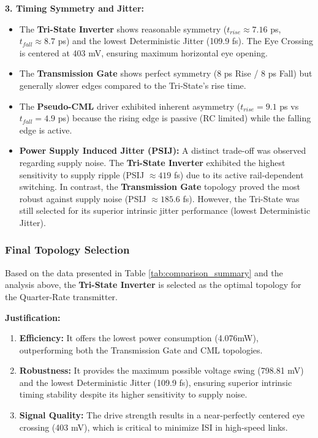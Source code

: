 \documentclass[12pt, a4paper]{report}
\begin{document}
\textbf{3. Timing Symmetry and Jitter:}
\begin{itemize}
    \item The \textbf{Tri-State Inverter} shows reasonable symmetry ($t_{rise} \approx 7.16$ ps, $t_{fall} \approx 8.7$ ps) and the lowest Deterministic Jitter (109.9 fs). The Eye Crossing is centered at 403 mV, ensuring maximum horizontal eye opening.
    \item The \textbf{Transmission Gate} shows perfect symmetry (8 ps Rise / 8 ps Fall) but generally slower edges compared to the Tri-State's rise time.
    \item The \textbf{Pseudo-CML} driver exhibited inherent asymmetry ($t_{rise}=9.1$ ps vs $t_{fall}=4.9$ ps) because the rising edge is passive (RC limited) while the falling edge is active.
    \item \textbf{Power Supply Induced Jitter (PSIJ):} A distinct trade-off was observed regarding supply noise. The \textbf{Tri-State Inverter} exhibited the highest sensitivity to supply ripple (PSIJ $\approx 419$ fs) due to its active rail-dependent switching. In contrast, the \textbf{Transmission Gate} topology proved the most robust against supply noise (PSIJ $\approx 185.6$ fs). However, the Tri-State was still selected for its superior intrinsic jitter performance (lowest Deterministic Jitter).
\end{itemize}
\subsubsection{Final Topology Selection}
Based on the data presented in Table \ref{tab:comparison_summary} and the analysis above, the \textbf{Tri-State Inverter} is selected as the optimal topology for the Quarter-Rate transmitter.

\textbf{Justification:}
\begin{enumerate}
    \item \textbf{Efficiency:} It offers the lowest power consumption (4.076mW), outperforming both the Transmission Gate and CML topologies.
    \item \textbf{Robustness:} It provides the maximum possible voltage swing (798.81 mV) and the lowest Deterministic Jitter (109.9 fs), ensuring superior intrinsic timing stability despite its higher sensitivity to supply noise.
    \item \textbf{Signal Quality:} The drive strength results in a near-perfectly centered eye crossing (403 mV), which is critical to minimize ISI in high-speed links.
\end{enumerate}
\end{document}
